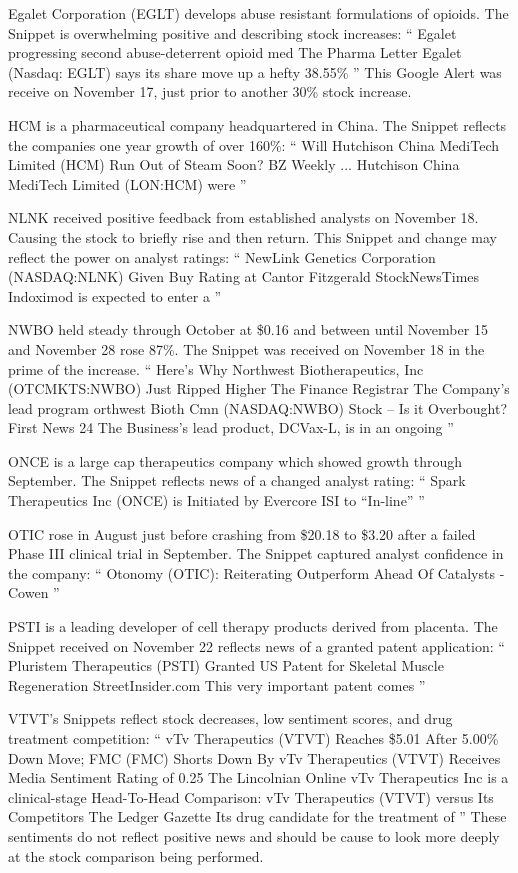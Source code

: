 \documentclass[sigconf]{acmart}
\begin{document}
Egalet Corporation (EGLT) develops abuse resistant formulations of opioids. The Snippet is overwhelming positive and describing stock increases:
``
Egalet progressing second abuse-deterrent opioid med The Pharma Letter Egalet (Nasdaq: EGLT) says its share move up a hefty 38.55\%
''
This Google Alert was receive on November 17, just prior to another 30\% stock increase.

HCM is a pharmaceutical company headquartered in China. The Snippet reflects the companies one year growth of over 160\%:
``
Will Hutchison China MediTech Limited (HCM) Run Out of Steam Soon? BZ Weekly ... Hutchison China MediTech Limited (LON:HCM) were
''

NLNK received positive feedback from established analysts on November 18. Causing the stock to briefly rise and then return. This Snippet and change may reflect the power on analyst ratings:
``
NewLink Genetics Corporation (NASDAQ:NLNK) Given Buy Rating at Cantor Fitzgerald StockNewsTimes Indoximod is expected to enter a
''

NWBO held steady through October at \$0.16 and between until November 15 and November 28 rose 87\%. The Snippet was received on November 18 in the prime of the increase.
``
Here's Why Northwest Biotherapeutics, Inc (OTCMKTS:NWBO) Just Ripped Higher The Finance Registrar The Company's lead program
orthwest Bioth Cmn (NASDAQ:NWBO) Stock – Is it Overbought? First News 24 The Business's lead product, DCVax-L, is in an ongoing
''

ONCE is a large cap therapeutics company which showed growth through September. The Snippet reflects news of a changed analyst rating:
``
Spark Therapeutics Inc (ONCE) is Initiated by Evercore ISI to ``In-line''
''

OTIC rose in August just before crashing from \$20.18 to \$3.20 after a failed Phase III clinical trial in September. The Snippet captured analyst confidence in the company: 
``
Otonomy (OTIC): Reiterating Outperform Ahead Of Catalysts - Cowen
''

PSTI is a leading developer of cell therapy products derived from placenta. The Snippet received on November 22 reflects news of a granted patent application:
``
Pluristem Therapeutics (PSTI) Granted US Patent for Skeletal Muscle Regeneration StreetInsider.com This very important patent comes
''

VTVT's Snippets reflect stock decreases, low sentiment scores, and drug treatment competition:
``
vTv Therapeutics (VTVT) Reaches \$5.01 After 5.00\% Down Move; FMC (FMC) Shorts Down By
vTv Therapeutics (VTVT) Receives Media Sentiment Rating of 0.25 The Lincolnian Online vTv Therapeutics Inc is a clinical-stage
Head-To-Head Comparison: vTv Therapeutics (VTVT) versus Its Competitors The Ledger Gazette Its drug candidate for the treatment of
''
These sentiments do not reflect positive news and should be cause to look more deeply at the stock comparison being performed. 
\end{document}
